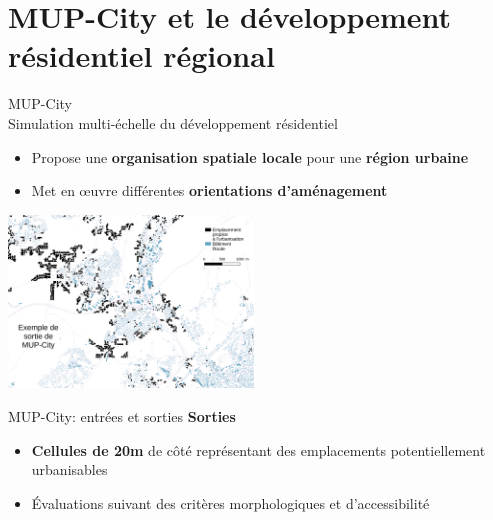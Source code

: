 \documentclass[xcolor=table]{beamer}
\begin{document}
\section[MUP-City]{MUP-City et le développement résidentiel régional}


\begin{frame}{MUP-City}
	\\
	Simulation multi-échelle du développement résidentiel 
	\begin{itemize}
		\item Propose une \textbf{organisation spatiale locale} pour une \textbf{région urbaine}
		\item Met en œuvre différentes \textbf{orientations d'aménagement}
	\end{itemize}
	\includegraphics[width=6.5cm]{Images/ex-sorties-mup.png}
\end{frame}

\begin{frame}{MUP-City: entrées et sorties}
	\textbf{Sorties}
	\begin{itemize}
		\item \textbf{Cellules de 20m} de côté représentant des emplacements potentiellement urbanisables
		\item Évaluations suivant des critères morphologiques et d'accessibilité
	\end{itemize}
	\begin{block}{}\end{block}
\end{frame}
\end{document}
